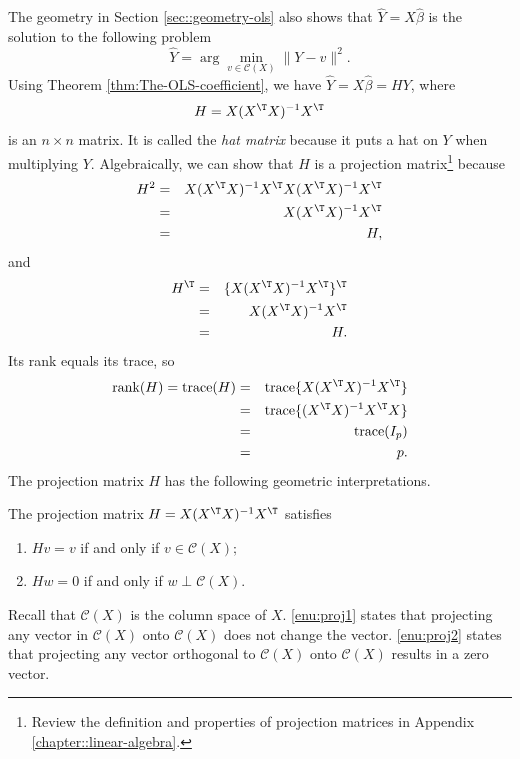 The geometry  in  Section \ref{sec::geometry-ols} also shows that $\hat{Y}=X\hat{\beta}$ is the  solution
to the following problem
\[
\hat{Y}=\arg\min_{v\in\mathcal{C}(X)}\|Y-v\|^{2}.
\]
Using Theorem \ref{thm:The-OLS-coefficient}, we have $\hat{Y}=X\hat{\beta}=HY$, 
where 
\[
H=X(X^{\T}X)^{-1}X^{\T}
\]
is an $n\times n$ matrix. It is called the {\it hat matrix} because it
puts a hat on $Y$ when multiplying $Y$. Algebraically, we can show that
$H$ is a projection matrix\footnote{
Review the definition and properties of projection matrices in Appendix \ref{chapter::linear-algebra}.
} because
\begin{eqnarray*}
H^{2} & = & X(X^{\T}X)^{-1}X^{\T}X(X^{\T}X)^{-1}X^{\T} \\
&=& X(X^{\T}X)^{-1}X^{\T} \\
&=& H,
\end{eqnarray*}
and
\begin{eqnarray*}
H^{\T} & = &\{ X(X^{\T}X)^{-1}X^{\T}\} ^{\T} \\
&=& X(X^{\T}X)^{-1}X^{\T} \\
&=& H.
\end{eqnarray*}
Its rank equals its trace, so 
\begin{eqnarray*}
\text{rank}(H) = 
\text{trace}(H)&=&\text{trace}\{ X(X^{\T}X)^{-1}X^{\T}\} \\
&=&\text{trace}\{ (X^{\T}X)^{-1}X^{\T}X\} \\
&=&\text{trace}(I_{p})\\
&=&p.
\end{eqnarray*}
The projection matrix $H$ has the following geometric interpretations. 

\begin{proposition}\label{prop::projectionmatrix-geometry}
The projection matrix $H=X(X^{\T}X)^{-1}X^{\T}$ satisfies
\begin{enumerate}[label=(G\arabic*), ref=G\arabic*]
\item \label{enu:proj1}$Hv=v$ if and only if $ v\in\mathcal{C}(X);$
\item \label{enu:proj2}$Hw=0$ if and only if $ w\perp\mathcal{C}(X).$
\end{enumerate}
\end{proposition}

Recall that $\mathcal{C}(X)$ is the column space of $X$. 
\eqref{enu:proj1} states that projecting any vector in $\mathcal{C}(X)$ onto $\mathcal{C}(X)$ does not change the vector. 
\eqref{enu:proj2} states that projecting any vector orthogonal to $\mathcal{C}(X)$ onto $\mathcal{C}(X)$ results in a zero vector. 

